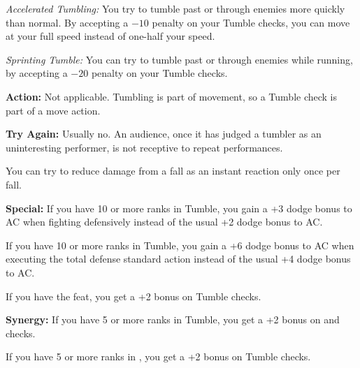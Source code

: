 \textit{Accelerated Tumbling:} You try to tumble past or through enemies more quickly than normal. By accepting a $-10$ penalty on your Tumble checks, you can move at your full speed instead of one-half your speed.

\textit{Sprinting Tumble:} You can try to tumble past or through enemies while running, by accepting a $-20$ penalty on your Tumble checks.

\textbf{Action:} Not applicable. Tumbling is part of movement, so a Tumble check is part of a move action.

\textbf{Try Again:} Usually no. An audience, once it has judged a tumbler as an uninteresting performer, is not receptive to repeat performances.

You can try to reduce damage from a fall as an instant reaction only once per fall.

\textbf{Special:} If you have 10 or more ranks in Tumble, you gain a +3 dodge bonus to AC when fighting defensively instead of the usual +2 dodge bonus to AC.

If you have 10 or more ranks in Tumble, you gain a +6 dodge bonus to AC when executing the total defense standard action instead of the usual +4 dodge bonus to AC.

If you have the  feat, you get a +2 bonus on Tumble checks.

\textbf{Synergy:} If you have 5 or more ranks in Tumble, you get a +2 bonus on  and  checks.

If you have 5 or more ranks in , you get a +2 bonus on Tumble checks.
